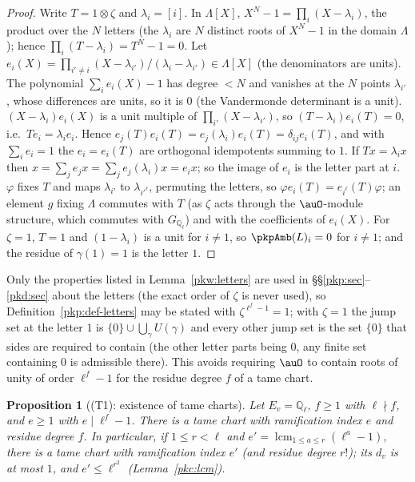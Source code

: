 \documentclass[10pt]{amsart}
\newtheorem{proposition}[theorem]{Proposition}
\theoremstyle{definition}
\theoremstyle{remark}
\newcommand{\Q}{\mathbb Q}
\begin{document}
\begin{proof}
Write $T=1\otimes\zeta$ and $\lambda_i=[i]$. In $\Lambda[X]$, $X^N-1=\prod_{i}(X-\lambda_i)$, the product
over the $N$ letters (the $\lambda_i$ are $N$ distinct roots of $X^N-1$ in the domain $\Lambda$); hence
$\prod_i(T-\lambda_i)=T^N-1=0$. Let $e_i(X)=\prod_{i'\ne i}(X-\lambda_{i'})/(\lambda_i-\lambda_{i'})\in
\Lambda[X]$ (the denominators are units). The polynomial $\sum_ie_i(X)-1$ has degree $<N$ and vanishes at
the $N$ points $\lambda_{i'}$, whose differences are units, so it is $0$ (the Vandermonde determinant is a
unit). $(X-\lambda_i)e_i(X)$ is a unit multiple of $\prod_{i'}(X-\lambda_{i'})$, so $(T-\lambda_i)e_i(T)=0$,
i.e.\ $Te_i=\lambda_ie_i$. Hence $e_j(T)e_i(T)=e_j(\lambda_i)e_i(T)=\delta_{ij}e_i(T)$, and with
$\sum_ie_i=1$ the $e_i=e_i(T)$ are orthogonal idempotents summing to $1$. If $Tx=\lambda_ix$ then
$x=\sum_je_jx=\sum_je_j(\lambda_i)x=e_ix$; so the image of $e_i$ is the letter part at $i$. $\varphi$ fixes
$T$ and maps $\lambda_{i'}$ to $\lambda_{i'^\ell}$, permuting the letters, so $\varphi e_i(T)=
e_{i^\ell}(T)\varphi$; an element $g$ fixing $\Lambda$ commutes with $T$ (as $\zeta$ acts through the
$\auO$-module structure, which commutes with $G_{\Q_\ell}$) and with the coefficients of $e_i(X)$. For
$\zeta=1$, $T=1$ and $(1-\lambda_i)$ is a unit for $i\ne1$, so $\pkpAmb(L)_i=0$ for $i\ne1$; and the
residue of $\gamma(1)=1$ is the letter $1$.
\end{proof}

Only the properties listed in Lemma~\ref{pkw:letters} are used in \S\S\ref{pkp:sec}--\ref{pkd:sec} about
the letters (the exact order of $\zeta$ is never used), so Definition~\ref{pkp:def-letters} may be stated
with $\zeta^{\ell^f-1}=1$; with $\zeta=1$ the jump set at the letter $1$ is $\{0\}\cup\bigcup_\gamma
U(\gamma)$ and every other jump set is the set $\{0\}$ that sides are required to contain (the other letter
parts being $0$, any finite set containing $0$ is admissible there). This avoids requiring $\auO$ to contain
roots of unity of order $\ell^f-1$ for the residue degree $f$ of a tame chart.

\begin{proposition}[(T1): existence of tame charts]\label{pkw:T1}
Let $E_v=\Q_\ell$, $f\ge1$ with $\ell\nmid f$, and $e\ge1$ with $e\mid\ell^f-1$. There is a tame chart with
ramification index $e$ and residue degree $f$. In particular, if $1\le r<\ell$ and
$e'=\operatorname{lcm}_{1\le a\le r}(\ell^a-1)$, there is a tame chart with ramification index $e'$ (and
residue degree $r!$); its $d_v$ is at most $1$, and $e'\le\ell^{r^2}$ (Lemma~\ref{pkc:lcm}).
\end{proposition}
\end{document}
